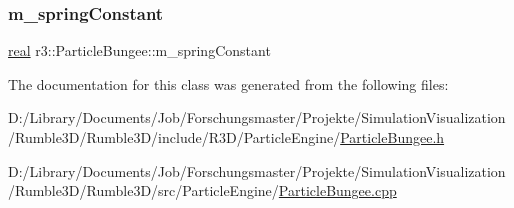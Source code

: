 \subsubsection{\texorpdfstring{m\+\_\+spring\+Constant}{m\_springConstant}}
{\footnotesize\ttfamily \mbox{\hyperlink{namespacer3_ab2016b3e3f743fb735afce242f0dc1eb}{real}} r3\+::\+Particle\+Bungee\+::m\+\_\+spring\+Constant\hspace{0.3cm}{\ttfamily [protected]}}



The documentation for this class was generated from the following files\+:\begin{DoxyCompactItemize}
\item 
D\+:/\+Library/\+Documents/\+Job/\+Forschungsmaster/\+Projekte/\+Simulation\+Visualization/\+Rumble3\+D/\+Rumble3\+D/include/\+R3\+D/\+Particle\+Engine/\mbox{\hyperlink{_particle_bungee_8h}{Particle\+Bungee.\+h}}\item 
D\+:/\+Library/\+Documents/\+Job/\+Forschungsmaster/\+Projekte/\+Simulation\+Visualization/\+Rumble3\+D/\+Rumble3\+D/src/\+Particle\+Engine/\mbox{\hyperlink{_particle_bungee_8cpp}{Particle\+Bungee.\+cpp}}\end{DoxyCompactItemize}
